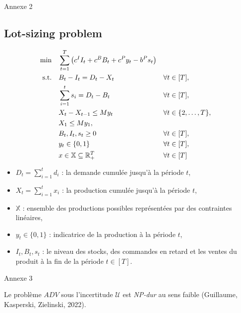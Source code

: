 \documentclass[10pt]{beamer}
\begin{document}
\begin{frame}[shrink=1]{Annexe 2}
    \subsection{Lot-sizing problem}
    
    \begin{align}
        \min \quad & \sum_{t=1}^{T} \left( c^I I_t + c^B B_t + c^P y_t - b^P s_t \right) \notag \\
        \text{s.t.} \quad & B_t - I_t = D_t - X_t && \forall t \in [T], \\
        & \sum_{i=1}^{t} s_i = D_t - B_t && \forall t \in [T], \\
        & X_t - X_{t-1} \leq M y_t && \forall t \in \{2, \dots, T\}, \\
        & X_1 \leq M y_1, \\
        & B_t, I_t, s_t \geq 0 && \forall t \in [T], \\
        & y_t \in \{0, 1\} && \forall t \in [T], \\
        & x \in \mathbb{X} \subseteq \mathbb{R}^T_+ && \forall t \in [T]
    \end{align}
    
    \begin{itemize}
        \item $D_t = \sum_{i=1}^{t} d_i$ : la demande cumulée jusqu'à la période $t$,
        \item $X_t = \sum_{i=1}^{t} x_i$ : la production cumulée jusqu'à la période $t$,
        \item $\mathbb{X}$ : ensemble des productions possibles représentées par des contraintes linéaires,
        \item $y_t \in \{0, 1\}$ : indicatrice de la production à la période $t$,
        \item $I_t, B_t, s_t$ : le niveau des stocks, des commandes en retard et les ventes du produit à la fin de la période $t \in [T]$.
    \end{itemize}
\end{frame}

\begin{frame}{Annexe 3}
	\begin{theorem}
		Le problème $ADV$ sous l'incertitude $\mathcal{U}$ est \textit{NP-dur} au sens faible (Guillaume, Kasperski, Zielinski, 2022).\cite{GOERIGK2023108941}
	\end{theorem}
\end{frame}
\end{document}
